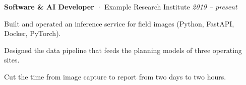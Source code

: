 \item \textbf{Software \& AI Developer} · Example Research Institute \hfill \textit{2019 -- present}
\begin{cvbullets}
  \item Built and operated an inference service for field images (Python, FastAPI, Docker, PyTorch).
  \item Designed the data pipeline that feeds the planning models of three operating sites.
  \item Cut the time from image capture to report from two days to two hours.
\end{cvbullets}
